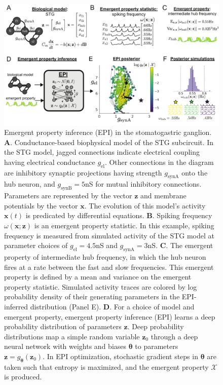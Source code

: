 \documentclass[11pt]{article}
\begin{document}
\begin{figure}
\begin{center}
\includegraphics[scale=0.8]{figures/fig1/fig1.pdf}
\end{center}
\caption{\small Emergent property inference (EPI) in the stomatogastric ganglion.  
\textbf{A}. Conductance-based biophysical model of the STG subcircuit.
In the STG model, jagged connections indicate electrical coupling having electrical conductance $g_{\text{el}}$. 
Other connections in the diagram are inhibitory synaptic projections having strength $g_{\text{synA}}$ onto the hub neuron, and $g_{\text{synB}}=5$nS for mutual inhibitory connections.  
Parameters are represented by the vector $\mathbf{z}$ and membrane potentials by the vector $\mathbf{x}$.
The evolution of this model's activity $\mathbf{x}(t)$ is predicated by differential equations.
\textbf{B}. Spiking frequency $\omega(\mathbf{x}; \mathbf{z})$ is an emergent property statistic. 
In this example, spiking frequency is measured from simulated activity of the STG model at parameter choices of $g_{\text{el}} = 4.5$nS and $g_{\text{synA}} = 3$nS.
\textbf{C}. The emergent property of intermediate hub frequency, in which the hub neuron fires at a rate between the fast and slow frequencies.
This emergent property is defined by a mean and variance on the emergent property statistic.
Simulated activity traces are colored by log probability density of their generating parameters in the EPI-inferred distribution (Panel E).
\textbf{D}. For a choice of model and emergent property, emergent property inference (EPI) learns a deep probability distribution of parameters $\mathbf{z}$.
Deep probability distributions map a simple random variable $\mathbf{z}_0$ through a deep neural network with weights and biases $\bm{\theta}$ to parameters $\mathbf{z} = g_{\bm{\theta}}(\mathbf{z}_0)$.
In EPI optimization, stochastic gradient steps in $\bm{\theta}$ are taken such that entropy is maximized, and the emergent property $\mathcal{X}$ is produced.
}
\end{figure}
\end{document}
